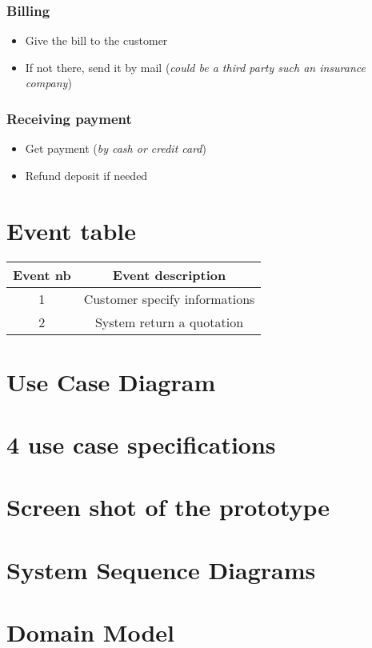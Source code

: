 \documentclass{report}
\begin{document}
\section{Billing}
    \begin{itemize}
        \item Give the bill to the customer
        \item If not there, send it by mail (\textit{could be a third party such an insurance company})
    \end{itemize}

\section{Receiving payment}
    \begin{itemize}
        \item Get payment (\textit{by cash or credit card})
        \item Refund deposit if needed
    \end{itemize}

\part{Event table}
\begin{center}
\begin{tabular}{|c|c|}
\hline
\textbf{Event nb} & \textbf{Event description} \\
\hline
1 & Customer specify informations \\
\hline
2 & System return a quotation \\
\hline
\end{tabular}
\end{center}

\part{Use Case Diagram}
\part{4 use case specifications}
\part{Screen shot of the prototype}
\part{System Sequence Diagrams}
\part{Domain Model}
\end{document}
